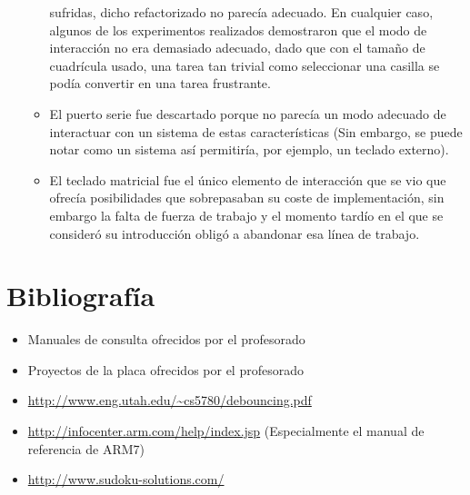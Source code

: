 \documentclass[12pt,letterpaper]{article}
\begin{document}
\begin{itemize}
\begin{itemize}
      sufridas, dicho refactorizado no parecía adecuado. En cualquier
      caso, algunos de los experimentos realizados demostraron que el
      modo de interacción no era demasiado adecuado, dado que con el
      tamaño de cuadrícula usado, una tarea tan trivial como
      seleccionar una casilla se podía convertir en una tarea
      frustrante.
    \item El puerto serie fue descartado porque no parecía un modo
      adecuado de interactuar con un sistema de estas características
      (Sin embargo, se puede notar como un sistema así permitiría, por
      ejemplo, un teclado externo).
    \item El teclado matricial fue el único elemento de interacción
      que se vio que ofrecía posibilidades que sobrepasaban su coste
      de implementación, sin embargo la falta de fuerza de trabajo y
      el momento tardío en el que se consideró su introducción obligó
      a abandonar esa línea de trabajo.
    \end{itemize}
\end{itemize}
\clearpage
\section{Bibliografía}
\begin{itemize}
  \item Manuales de consulta ofrecidos por el profesorado
  \item Proyectos de la placa ofrecidos por el profesorado
  \item \url{http://www.eng.utah.edu/~cs5780/debouncing.pdf}
  \item \url{http://infocenter.arm.com/help/index.jsp} (Especialmente el
    manual de referencia de ARM7)
  \item \url{http://www.sudoku-solutions.com/}
\end{itemize}
\end{document}
